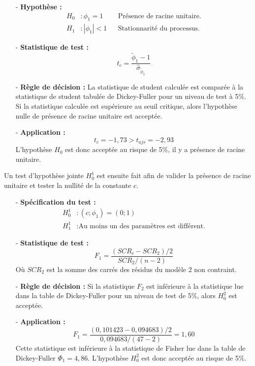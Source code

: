 \begin{itemize}
\item[-]\textbf{ Hypothèse :} 
\begin{align*}
        H_{0} &: \phi_{1} = 1  & &\text{Présence de racine unitaire.}\\
        H_{1} &:|\phi_{1}| < 1   &  &\text{Stationnarité du processus.}
\end{align*}
\item[-]\textbf{Statistique de test :} 
\begin{equation*}
    t_{c} = \frac{\tilde{\phi}_{1}- 1}{\hat{\sigma}_{\tilde{\phi}_{1}}}
\end{equation*}
\item[-]\textbf{Règle de décision :} La statistique de student calculée est comparée à la statistique de student tabulée de Dickey-Fuller pour un niveau de test à 
5\%. Si la statistique calculée est supérieure au seuil critique, alors l'hypothèse nulle de présence de racine unitaire est acceptée.
\item[-]\textbf{Application :} 
\begin{equation*}
    t_{c} = -1,73 > t_{ajs} = -2,93
\end{equation*}
L'hypothèse $H_{0}$ est donc acceptée au risque de 5\%, il y a présence de racine unitaire.
\end{itemize}
%
Un test d'hypothèse jointe $H_{0}^{1}$ est ensuite fait afin de valider la présence de racine unitaire et tester la nullité de la constante $c$.
\begin{itemize}
\item[-]\textbf{Spécification du test :} 
\begin{equation*}
    \begin{split}
        H_{0}^{1} &: (c; \phi_{1}) = (0;1)\\
        H_{1}^{1} &: \text{Au moins un des paramètres est différent.}
    \end{split}
\end{equation*}
\item[-]\textbf{Statistique de test :}
\begin{equation*}
    F_{1} = \frac{(SCR_{c} - SCR_{2})/2}{SCR_{2}/(n-2)}
\end{equation*}
Où $SCR_{2}$ est la somme des carrés des résidus du modèle 2 non contraint.
\item[-]\textbf{Règle de décision :}  Si la statistique $F_{2}$ est inférieure à la statistique lue dans la table de Dickey-Fuller pour un niveau de test de 5\%, alors 
$H_{0}^{2}$ est acceptée.
\item[-]\textbf{Application :} 
\begin{equation*}
    F_{1} = \frac{(0,101423 - 0,094683)/2}{0,094683/(47-2)} = 1,60
\end{equation*}
Cette statistique est inférieure à la statistique de Fisher lue dans la table de Dickey-Fuller $\Phi_{1} = 4,86$. L'hypothèse $H_{0}^{2}$ est donc acceptée au risque 
de 5\%. 
\end{itemize}
